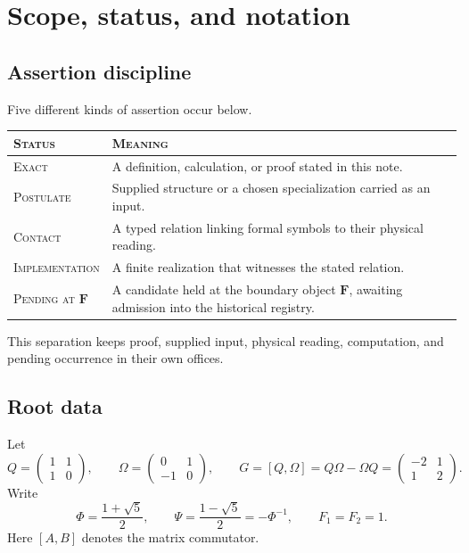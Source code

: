 \documentclass[10pt]{article}
\theoremstyle{remark}
\newcommand{\exact}{\textsc{Exact}}
\newcommand{\postulate}{\textsc{Postulate}}
\newcommand{\interface}{\textsc{Contact}}
\newcommand{\implementation}{\textsc{Implementation}}
\newcommand{\pending}{\textsc{Pending at $\mathbf F$}}
\begin{document}
\section{Scope, status, and notation}

\subsection{Assertion discipline}

Five different kinds of assertion occur below.

\begin{center}
\begin{tabular}{@{}p{3.15cm}p{9.5cm}@{}}
\toprule
\textsc{Status} & \textsc{Meaning}\\
\midrule
\exact & A definition, calculation, or proof stated in this note.\\
\postulate & Supplied structure or a chosen specialization carried as an input.\\
\interface & A typed relation linking formal symbols to their physical reading.\\
\implementation & A finite realization that witnesses the stated relation.\\
\pending & A candidate held at the boundary object $\mathbf F$, awaiting admission into the historical registry.\\
\bottomrule
\end{tabular}
\end{center}

This separation keeps proof, supplied input, physical reading, computation,
and pending occurrence in their own offices.

\subsection{Root data}

Let
\[
 Q=\begin{pmatrix}1&1\\1&0\end{pmatrix},\qquad
 \Omega=\begin{pmatrix}0&1\\-1&0\end{pmatrix},\qquad
 G=[Q,\Omega]=Q\Omega-\Omega Q
   =\begin{pmatrix}-2&1\\1&2\end{pmatrix}.
\tag{1}
\]
Write
\[
 \Phi=\frac{1+\sqrt5}{2},\qquad
 \Psi=\frac{1-\sqrt5}{2}=-\Phi^{-1},\qquad F_1=F_2=1.
\tag{2}
\]
Here $[A,B]$ denotes the matrix commutator.
\end{document}
